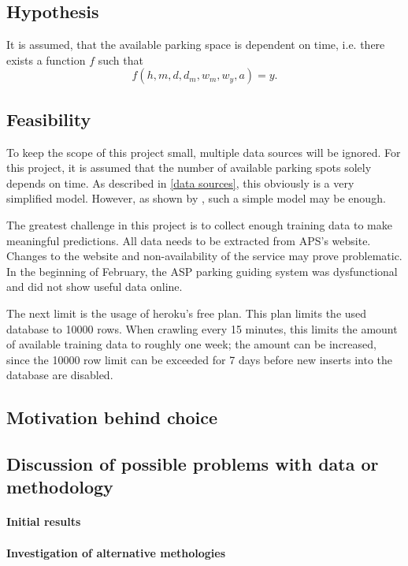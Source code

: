 \documentclass[journal,10pt]{IEEEtran}
\newcommand{\hod}{h}
\newcommand{\moh}{m}
\newcommand{\dow}{d}
\newcommand{\dom}{d_m}
\newcommand{\wom}{w_m}
\newcommand{\woy}{w_y}
\newcommand{\yyy}{a}
\begin{document}
\subsection{Hypothesis}

It is assumed, that the available parking space is dependent on time, i.e. there exists a function \(f\) such that 
\[
f(\hod, \moh, \dow, \dom, \wom, \woy, \yyy) = y\text{.}
\]



\subsection{Feasibility}

To keep the scope of this project small, multiple data sources will be ignored. For this project, it is assumed that the number of available parking spots solely depends on time. As described in \ref{data sources}, this obviously is a very simplified model. However, as shown by \cite{parkendd}, such a simple model may be enough. 

The greatest challenge in this project is to collect enough training data to make meaningful predictions. All data needs to be extracted from APS's website. Changes to the website and non-availability of the service may prove problematic. In the beginning of February, the ASP parking guiding system was dysfunctional and did not show useful data online. 

The next limit is the usage of heroku's free plan. This plan limits the used database to 10000 rows. When crawling every 15 minutes, this limits the amount of available training data to roughly one week; the amount can be increased, since the 10000 row limit can be exceeded for 7 days before new inserts into the database are disabled.

\subsection{Motivation behind choice}

\subsection{Discussion of possible problems with data or methodology}


\paragraph{Initial results}
\paragraph{Investigation of alternative methologies}
\end{document}

